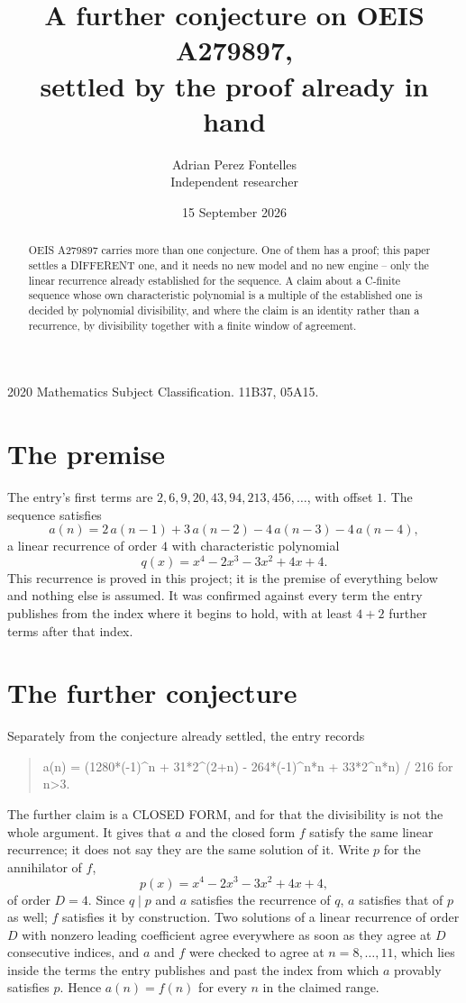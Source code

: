 \documentclass[11pt,a4paper]{article}
\title{A further conjecture on OEIS A279897,\\ \large settled by the proof already in hand}
\author{Adrian Perez Fontelles\\ \small Independent researcher}
\date{15 September 2026}
\theoremstyle{plain}
\theoremstyle{definition}
\begin{document}
\maketitle

\begin{abstract}
OEIS A279897 carries more than one conjecture. One of them has a proof; this paper settles a
DIFFERENT one, and it needs no new model and no new engine -- only the linear recurrence already
established for the sequence. A claim about a C-finite sequence whose own characteristic
polynomial is a multiple of the established one is decided by polynomial divisibility, and where
the claim is an identity rather than a recurrence, by divisibility together with a finite window
of agreement.
\end{abstract}

\noindent\small 2020 Mathematics Subject Classification. 11B37, 05A15.\normalsize

\section{The premise}

The entry's first terms are $2, 6, 9, 20, 43, 94, 213, 456,\dots$, with offset $1$. The sequence satisfies
\[
  a(n)=2\,a(n-1) + 3\,a(n-2) - 4\,a(n-3) - 4\,a(n-4) ,
\]
a linear recurrence of order $4$ with characteristic polynomial
\[
  q(x)=x^{4} - 2 x^{3} - 3 x^{2} + 4 x + 4 .
\]
This recurrence is proved in this project; it is the premise of everything below and nothing else is assumed.
It was confirmed against every term the entry publishes from the index where it begins to hold,
with at least $4+2$ further terms after that index.

\section{The further conjecture}

Separately from the conjecture already settled, the entry records

\begin{quote}\raggedright a(n) = (1280*(-1)\^{}n + 31*2\^{}(2+n) - 264*(-1)\^{}n*n + 33*2\^{}n*n) / 216 for n>3.\end{quote}

The further claim is a CLOSED FORM, and for that the divisibility is not the whole argument. It
gives that $a$ and the closed form $f$ satisfy the same linear recurrence; it does not say they
are the same solution of it. Write $p$ for the annihilator of $f$,
\[
  p(x)=x^{4} - 2 x^{3} - 3 x^{2} + 4 x + 4 ,
\]
of order $D=4$. Since $q\mid p$ and $a$ satisfies the recurrence of $q$, $a$ satisfies that of
$p$ as well; $f$ satisfies it by construction. Two solutions of a linear recurrence of order $D$
with nonzero leading coefficient agree everywhere as soon as they agree at $D$ consecutive
indices, and $a$ and $f$ were checked to agree at $n=8,\dots,11$,
which lies inside the terms the entry publishes and past the index from which $a$ provably
satisfies $p$. Hence $a(n)=f(n)$ for every $n$ in the claimed range.
\end{document}
